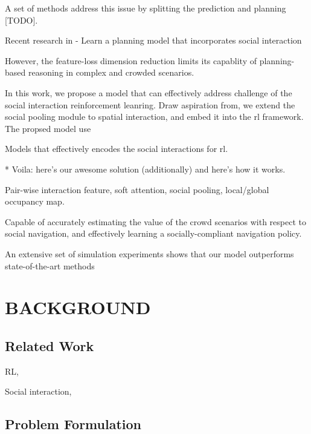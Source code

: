 \documentclass[letterpaper, 10 pt, conference]{ieeeconf}  %
\begin{document}
A set of methods address this issue by splitting the prediction and planning [TODO]. 

Recent research in 
- Learn a planning model that incorporates social interaction \cite{chen_decentralized_2016,chen_socially_2017,everett_motion_2018}

However, the feature-loss dimension reduction limits its capablity of planning-based reasoning in complex and crowded scenarios. 

\vspace{2cm}

In this work, we propose a model that can effectively address challenge of the social interaction reinforcement leanring. Draw aspiration from, we extend the social pooling module to spatial interaction, and embed it into the rl framework. The propsed model use 

Models that effectively encodes the social interactions for rl. 

\vspace{2cm}

* Voila: here's our awesome solution (additionally) and here's how it works.

Pair-wise interaction feature, soft attention, social pooling, local/global occupancy map.

Capable of accurately estimating the value of the crowd scenarios with respect to social navigation, and effectively learning a socially-compliant navigation policy. 

An extensive set of simulation experiments shows that our model outperforms state-of-the-art methods 


\vspace{10cm}

\section{BACKGROUND} \label{sec:background} 

\subsection{Related Work}

RL, 
\vspace{2cm}

Social interaction, 
\vspace{2cm}

\subsection{Problem Formulation}
\end{document}
